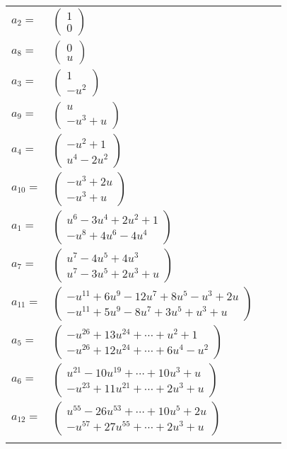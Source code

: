 \documentclass[1p]{elsarticle_modified}
\theoremstyle{definition}
\begin{document}
\begin{tabular}{m{7pt} m{180pt} m{7pt} m{180pt} }
\flushright $a_{2}=$&$\begin{pmatrix}1\\0\end{pmatrix}$ \\
\flushright $a_{8}=$&$\begin{pmatrix}0\\u\end{pmatrix}$ \\
\flushright $a_{3}=$&$\begin{pmatrix}1\\- u^2\end{pmatrix}$ \\
\flushright $a_{9}=$&$\begin{pmatrix}u\\- u^3+u\end{pmatrix}$ \\
\flushright $a_{4}=$&$\begin{pmatrix}- u^2+1\\u^4-2 u^2\end{pmatrix}$ \\
\flushright $a_{10}=$&$\begin{pmatrix}- u^3+2 u\\- u^3+u\end{pmatrix}$ \\
\flushright $a_{1}=$&$\begin{pmatrix}u^6-3 u^4+2 u^2+1\\- u^8+4 u^6-4 u^4\end{pmatrix}$ \\
\flushright $a_{7}=$&$\begin{pmatrix}u^7-4 u^5+4 u^3\\u^7-3 u^5+2 u^3+u\end{pmatrix}$ \\
\flushright $a_{11}=$&$\begin{pmatrix}- u^{11}+6 u^9-12 u^7+8 u^5- u^3+2 u\\- u^{11}+5 u^9-8 u^7+3 u^5+u^3+u\end{pmatrix}$ \\
\flushright $a_{5}=$&$\begin{pmatrix}- u^{26}+13 u^{24}+\cdots+u^2+1\\- u^{26}+12 u^{24}+\cdots+6 u^4- u^2\end{pmatrix}$ \\
\flushright $a_{6}=$&$\begin{pmatrix}u^{21}-10 u^{19}+\cdots+10 u^3+u\\- u^{23}+11 u^{21}+\cdots+2 u^3+u\end{pmatrix}$ \\
\flushright $a_{12}=$&$\begin{pmatrix}u^{55}-26 u^{53}+\cdots+10 u^5+2 u\\- u^{57}+27 u^{55}+\cdots+2 u^3+u\end{pmatrix}$\\&\end{tabular}
\end{document}
